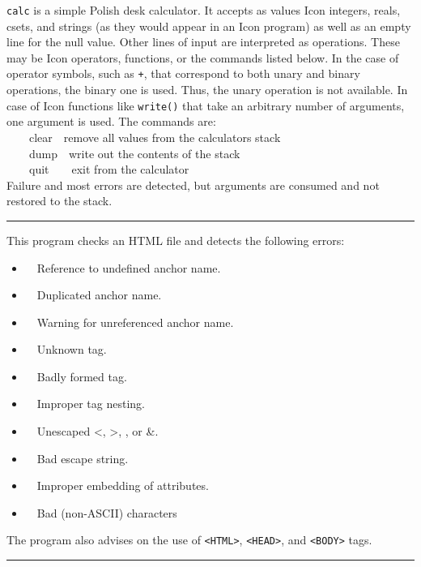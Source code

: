 {\texttt{calc} is a simple Polish {\textquotedbl}desk
calculator{\textquotedbl}. It accepts as values Icon integers, reals,
csets, and strings (as they would appear in an Icon program) as well as
an empty line for the null value. Other lines of input are interpreted
as operations. These may be Icon operators, functions, or the commands
listed below. In the case of operator symbols, such as \texttt{+}, that
correspond to both unary and binary operations, the binary one is used.
Thus, the unary operation is not available. In case of Icon functions
like \texttt{write()} that take an arbitrary number of arguments, one
argument is used. The commands are:\\
 \ \ \ \ clear\ \ remove all values from the
calculator{\textquotesingle}s stack\\
 \ \ \ \ dump\ \ write out the contents of the stack\\
 \ \ \ \ quit\ \ \ \ exit from the calculator\\
Failure and most errors are detected, but arguments are consumed and not
restored to the stack.

\vspace{0.25cm}\hrule{}

This program checks an HTML file and detects the following
errors:

\begin{itemize}
\item \ \ Reference to undefined anchor name.
\item \ \ Duplicated anchor name.
\item \ \ Warning for unreferenced anchor name.
\item \ \ Unknown tag.
\item \ \ Badly formed tag.
\item \ \ Improper tag nesting.
\item \ \ Unescaped {\textless}, {\textgreater}, {\textquotedbl}, or \&.
\item \ \ Bad escape string.
\item \ \ Improper embedding of attributes.
\item \ \ Bad (non-ASCII) characters
\end{itemize}
The program also advises on the use of
\texttt{{\textless}HTML{\textgreater}},
\texttt{{\textless}HEAD{\textgreater}}, and
\texttt{{\textless}BODY{\textgreater}} tags. 

\vspace{0.25cm}\hrule{}

}
